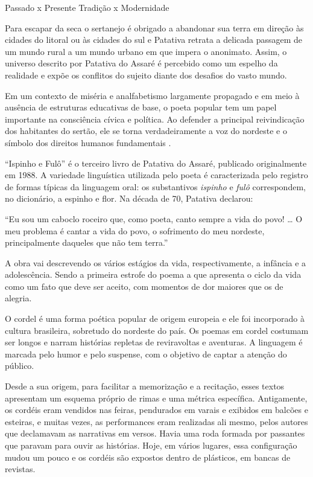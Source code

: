 \documentclass[12pt]{extarticle}
\begin{document}
{Passado x Presente
Tradição x Modernidade

Para escapar da seca o sertanejo é obrigado a abandonar sua terra em 
direção às cidades do litoral ou às cidades do sul e Patativa retrata a 
delicada passagem de um mundo rural a um mundo urbano em que impera o 
anonimato. Assim, o universo descrito por Patativa do Assaré é percebido 
como um espelho da realidade e expõe os conflitos do sujeito diante dos 
desafios do vasto mundo. 

Em um contexto de miséria e analfabetismo largamente propagado e em meio 
à ausência de estruturas educativas de base, o poeta popular tem um 
papel importante na consciência cívica e política. Ao defender a principal 
reivindicação dos habitantes do sertão, ele se torna verdadeiramente a 
voz do nordeste e o símbolo dos direitos humanos fundamentais .

``Ispinho e Fulô'' é o terceiro livro de Patativa do Assaré, publicado 
originalmente em 1988. A variedade linguística utilizada pelo poeta é 
caracterizada pelo registro de formas típicas da linguagem oral: os 
substantivos \textit{ispinho} e \textit{fulô} correspondem, no dicionário, 
a espinho e flor. Na década de 70, Patativa declarou:

``Eu sou um caboclo roceiro que, como poeta, canto sempre a vida do povo! 
{}\ldots{} O meu problema é cantar a vida do povo, o sofrimento do meu 
nordeste, principalmente daqueles que não tem terra.''
 
A obra vai descrevendo os vários estágios da vida, respectivamente, a 
infância e a adolescência. Sendo a primeira estrofe do poema a que 
apresenta o ciclo da vida como um fato que deve ser aceito, com momentos 
de dor maiores que os de alegria.

O cordel é uma forma poética popular de origem europeia e ele foi 
incorporado à cultura brasileira, sobretudo do nordeste do país. 
Os poemas em cordel costumam ser longos e narram histórias repletas de 
reviravoltas e aventuras. A linguagem é marcada pelo humor e pelo 
suspense, com o objetivo de captar a atenção do público. 
 
Desde a sua origem, para facilitar a memorização e a recitação, esses 
textos apresentam um esquema próprio de rimas e uma métrica específica. 
Antigamente, os cordéis eram vendidos nas feiras, pendurados em varais e 
exibidos em balcões e esteiras, e muitas vezes, as performances eram 
realizadas ali mesmo, pelos autores que declamavam as narrativas em versos. 
Havia uma roda formada por passantes que paravam para ouvir as histórias. 
Hoje, em vários lugares, essa configuração mudou um pouco e os cordéis 
são expostos dentro de plásticos, em bancas de revistas.
 
}
\end{document}
